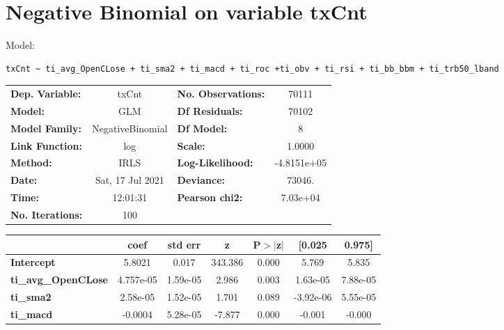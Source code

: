 \section{Negative Binomial on variable txCnt}

Model: \begin{verbatim}txCnt ~ ti_avg_OpenCLose + ti_sma2 + ti_macd + ti_roc +ti_obv + ti_rsi + ti_bb_bbm + ti_trb50_lband\end{verbatim}

\begin{center}
\begin{tabular}{lclc}
\toprule
\textbf{Dep. Variable:}     &      txCnt       & \textbf{  No. Observations:  } &     70111    \\
\textbf{Model:}             &       GLM        & \textbf{  Df Residuals:      } &     70102    \\
\textbf{Model Family:}      & NegativeBinomial & \textbf{  Df Model:          } &         8    \\
\textbf{Link Function:}     &       log        & \textbf{  Scale:             } &     1.0000   \\
\textbf{Method:}            &       IRLS       & \textbf{  Log-Likelihood:    } & -4.8151e+05  \\
\textbf{Date:}              & Sat, 17 Jul 2021 & \textbf{  Deviance:          } &     73046.   \\
\textbf{Time:}              &     12:01:31     & \textbf{  Pearson chi2:      } &   7.03e+04   \\
\textbf{No. Iterations:}    &       100        & \textbf{                     } &              \\
\bottomrule
\end{tabular}
\begin{tabular}{lcccccc}
                            & \textbf{coef} & \textbf{std err} & \textbf{z} & \textbf{P$> |$z$|$} & \textbf{[0.025} & \textbf{0.975]}  \\
\midrule
\textbf{Intercept}          &       5.8021  &        0.017     &   343.386  &         0.000        &        5.769    &        5.835     \\
\textbf{ti\_avg\_OpenCLose} &    4.757e-05  &     1.59e-05     &     2.986  &         0.003        &     1.63e-05    &     7.88e-05     \\
\textbf{ti\_sma2}           &     2.58e-05  &     1.52e-05     &     1.701  &         0.089        &    -3.92e-06    &     5.55e-05     \\
\textbf{ti\_macd}           &      -0.0004  &     5.28e-05     &    -7.877  &         0.000        &       -0.001    &       -0.000     \\

\end{tabular}
\end{center}
